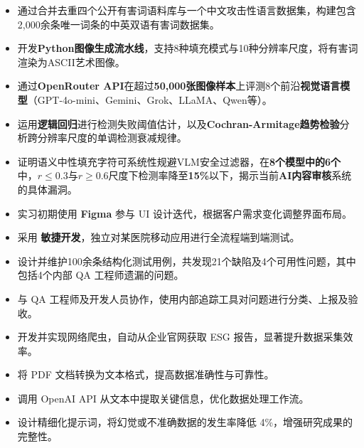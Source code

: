 \documentclass{resume}
\begin{document}
\begin{itemize}
  \item 通过合并去重四个公开有害词语料库与一个中文攻击性语言数据集，构建包含2,000余条唯一词条的中英双语有害词数据集。
  \item 开发\textbf{Python图像生成流水线}，支持8种填充模式与10种分辨率尺度，将有害词渲染为ASCII艺术图像。
  \item 通过\textbf{OpenRouter API}在超过\textbf{50,000张图像样本}上评测8个前沿\textbf{视觉语言模型}（GPT-4o-mini、Gemini、Grok、LLaMA、Qwen等）。
  \item 运用\textbf{逻辑回归}进行检测失败阈值估计，以及\textbf{Cochran-Armitage趋势检验}分析跨分辨率尺度的单调检测衰减规律。
  \item 证明语义中性填充字符可系统性规避VLM安全过滤器，在\textbf{8个模型中的6个}中，$r \leq 0.3$与$r \geq 0.6$尺度下检测率降至\textbf{15\%}以下，揭示当前\textbf{AI内容审核}系统的具体漏洞。
\end{itemize}

\begin{itemize}
  \item 实习初期使用 \textbf{Figma} 参与 UI 设计迭代，根据客户需求变化调整界面布局。
  \item 采用 \textbf{敏捷开发}，独立对某医院移动应用进行全流程端到端测试。
  \item 设计并维护100余条结构化测试用例，共发现21个缺陷及4个可用性问题，其中包括4个内部 QA 工程师遗漏的问题。
  \item 与 QA 工程师及开发人员协作，使用内部追踪工具对问题进行分类、上报及验收。
\end{itemize}

\begin{itemize}
  \item 开发并实现网络爬虫，自动从企业官网获取 ESG 报告，显著提升数据采集效率。
  \item 将 PDF 文档转换为文本格式，提高数据准确性与可靠性。
  \item 调用 OpenAI API 从文本中提取关键信息，优化数据处理工作流。
  \item 设计精细化提示词，将幻觉或不准确数据的发生率降低 4\%，增强研究成果的完整性。
\end{itemize}
\end{document}
